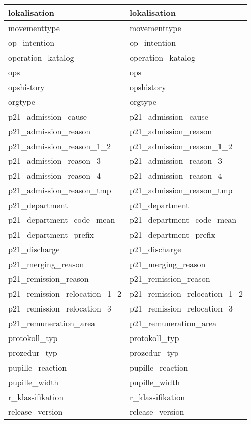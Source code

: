 \begin{longtable}{||p{6cm}|p{7.8cm}||}
  	lokalisation & lokalisation\\ \hline
  	movementtype & movementtype\\ \hline
  	op\_intention & op\_intention\\ \hline
  	operation\_katalog & operation\_katalog\\ \hline
  	ops & ops\\ \hline
  	opshistory & opshistory\\ \hline
  	orgtype & orgtype\\ \hline
  	p21\_admission\_cause & p21\_admission\_cause\\ \hline
  	p21\_admission\_reason & p21\_admission\_reason\\ \hline
  	p21\_admission\_reason\_1\_2 & p21\_admission\_reason\_1\_2\\ \hline
  	p21\_admission\_reason\_3 & p21\_admission\_reason\_3\\ \hline
  	p21\_admission\_reason\_4 & p21\_admission\_reason\_4\\ \hline
  	p21\_admission\_reason\_tmp & p21\_admission\_reason\_tmp\\ \hline
  	p21\_department & p21\_department\\ \hline
  	p21\_department\_code\_mean & p21\_department\_code\_mean\\ \hline
  	p21\_department\_prefix & p21\_department\_prefix\\ \hline
  	p21\_discharge & p21\_discharge\\ \hline
  	p21\_merging\_reason & p21\_merging\_reason\\ \hline
  	p21\_remission\_reason & p21\_remission\_reason\\ \hline
  	p21\_remission\_relocation\_1\_2 & p21\_remission\_relocation\_1\_2\\ \hline
  	p21\_remission\_relocation\_3 & p21\_remission\_relocation\_3\\ \hline
  	p21\_remuneration\_area & p21\_remuneration\_area\\ \hline
  	protokoll\_typ & protokoll\_typ\\ \hline
  	prozedur\_typ & prozedur\_typ\\ \hline
  	pupille\_reaction & pupille\_reaction\\ \hline
  	pupille\_width & pupille\_width\\ \hline
  	r\_klassifikation & r\_klassifikation\\ \hline
  	release\_version & release\_version\\ \hline

\end{longtable}
